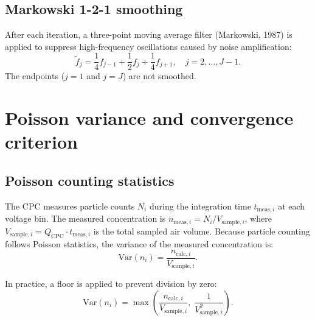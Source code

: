 \documentclass[11pt,a4paper]{article}
\begin{document}
\subsection{Markowski 1-2-1 smoothing}
\label{sec:smoothing}

After each iteration, a three-point moving average filter (Markowski, 1987) is
applied to suppress high-frequency oscillations caused by noise amplification:
\begin{equation}
  \tilde{f}_{j} =
    \frac{1}{4} f_{j-1} + \frac{1}{2} f_{j} + \frac{1}{4} f_{j+1},
  \quad j = 2, \ldots, J-1.
  \label{eq:markowski-smoothing}
\end{equation}
The endpoints ($j = 1$ and $j = J$) are not smoothed.

\section{Poisson variance and convergence criterion}
\label{sec:convergence}

\subsection{Poisson counting statistics}
\label{sec:poisson}

The CPC measures particle counts $N_{i}$ during the integration time
$t_{\mathrm{meas},i}$ at each voltage bin.  The measured concentration is
$n_{\mathrm{meas},i} = N_{i} / V_{\mathrm{sample},i}$, where
$V_{\mathrm{sample},i} = Q_{\mathrm{CPC}} \cdot t_{\mathrm{meas},i}$ is the
total sampled air volume.  Because particle counting follows Poisson
statistics, the variance of the measured concentration is:
\begin{equation}
  \mathrm{Var}(n_{i}) =
    \frac{n_{\mathrm{calc},i}}{V_{\mathrm{sample},i}}.
  \label{eq:poisson-variance}
\end{equation}

In practice, a floor is applied to prevent division by zero:
\begin{equation}
  \mathrm{Var}(n_{i}) =
    \max\!\left(
      \frac{n_{\mathrm{calc},i}}{V_{\mathrm{sample},i}}, \;
      \frac{1}{V_{\mathrm{sample},i}^{2}}
    \right).
  \label{eq:variance-floor}
\end{equation}
\end{document}
